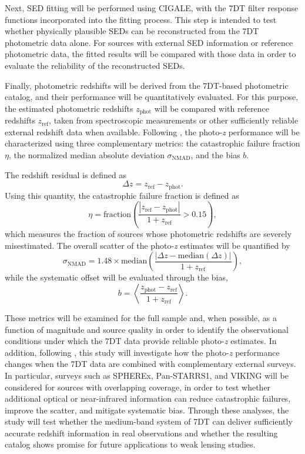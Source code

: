 \documentclass[11pt]{article}
\begin{document}
Next, SED fitting will be performed using \textsc{CIGALE}, with the 7DT filter response functions incorporated into the fitting process. This step is intended to test whether physically plausible SEDs can be reconstructed from the 7DT photometric data alone. For sources with external SED information or reference photometric data, the fitted results will be compared with those data in order to evaluate the reliability of the reconstructed SEDs.

Finally, photometric redshifts will be derived from the 7DT-based photometric catalog, and their performance will be quantitatively evaluated. For this purpose, the estimated photometric redshifts $z_{\mathrm{phot}}$ will be compared with reference redshifts $z_{\mathrm{ref}}$, taken from spectroscopic measurements or other sufficiently reliable external redshift data when available. Following \citet{Ko2025}, the photo-\textit{z} performance will be characterized using three complementary metrics: the catastrophic failure fraction $\eta$, the normalized median absolute deviation $\sigma_{\mathrm{NMAD}}$, and the bias $b$.

The redshift residual is defined as
\[
\Delta z = z_{\mathrm{ref}} - z_{\mathrm{phot}} .
\]
Using this quantity, the catastrophic failure fraction is defined as
\[
\eta = \mathrm{fraction}\left( \frac{|z_{\mathrm{ref}} - z_{\mathrm{phot}}|}{1+z_{\mathrm{ref}}} > 0.15 \right) ,
\]
which measures the fraction of sources whose photometric redshifts are severely misestimated. The overall scatter of the photo-\textit{z} estimates will be quantified by
\[
\sigma_{\mathrm{NMAD}}
=
1.48 \times
\mathrm{median}
\left(
\frac{|\Delta z - \mathrm{median}(\Delta z)|}{1+z_{\mathrm{ref}}}
\right) ,
\]
while the systematic offset will be evaluated through the bias,
\[
b
=
\left\langle
\frac{z_{\mathrm{phot}} - z_{\mathrm{ref}}}{1+z_{\mathrm{ref}}}
\right\rangle .
\]

These metrics will be examined for the full sample and, when possible, as a function of magnitude and source quality in order to identify the observational conditions under which the 7DT data provide reliable photo-\textit{z} estimates. In addition, following \citet{Ko2025}, this study will investigate how the photo-\textit{z} performance changes when the 7DT data are combined with complementary external surveys. In particular, surveys such as SPHEREx, Pan-STARRS1, and VIKING will be considered for sources with overlapping coverage, in order to test whether additional optical or near-infrared information can reduce catastrophic failures, improve the scatter, and mitigate systematic bias. Through these analyses, the study will test whether the medium-band system of 7DT can deliver sufficiently accurate redshift information in real observations and whether the resulting catalog shows promise for future applications to weak lensing studies.
\end{document}
